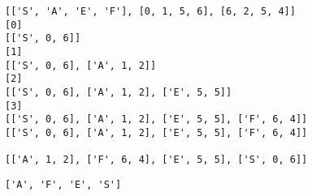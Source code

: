 \documentclass[11pt]{article}
\makeatletter
\newcommand{\boxspacing}{\kern\kvtcb@left@rule\kern\kvtcb@boxsep}
\newcommand{\prompt}[4]{
        {\ttfamily\llap{{\color{#2}[#3]:\hspace{3pt}#4}}\vspace{-\baselineskip}}
    }
\makeatother
\begin{document}
    \begin{Verbatim}[commandchars=\\\{\}]
[['S', 'A', 'E', 'F'], [0, 1, 5, 6], [6, 2, 5, 4]]
[0]
[['S', 0, 6]]
[1]
[['S', 0, 6], ['A', 1, 2]]
[2]
[['S', 0, 6], ['A', 1, 2], ['E', 5, 5]]
[3]
[['S', 0, 6], ['A', 1, 2], ['E', 5, 5], ['F', 6, 4]]
[['S', 0, 6], ['A', 1, 2], ['E', 5, 5], ['F', 6, 4]]

[['A', 1, 2], ['F', 6, 4], ['E', 5, 5], ['S', 0, 6]]
    \end{Verbatim}

            \begin{tcolorbox}[breakable, size=fbox, boxrule=.5pt, pad at break*=1mm, opacityfill=0]
\prompt{Out}{outcolor}{125}{\boxspacing}
\begin{Verbatim}[commandchars=\\\{\}]
['A', 'F', 'E', 'S']
\end{Verbatim}
\end{tcolorbox}
        
\end{document}
